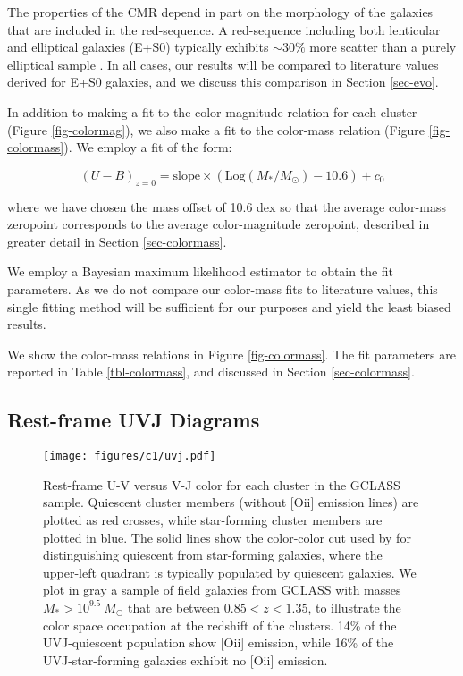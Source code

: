 The properties of the CMR depend in part on the morphology of the galaxies that are included in the red-sequence. A red-sequence including both lenticular and elliptical galaxies (E+S0) typically exhibits $\sim 30\%$ more scatter than a purely elliptical sample  \citep[see e.g.][M09]{Bower:1992mb}. In all cases, our results will be compared to literature values derived for E+S0 galaxies, and we discuss this comparison in Section \ref{sec-evo}.

In addition to making a fit to the color-magnitude relation for each cluster (Figure \ref{fig-colormag}), we also make a fit to the color-mass relation (Figure \ref{fig-colormass}). We employ a fit of the form:

\begin{equation}\label{eq-colormass}
(U-B)_{z=0} = \mathrm{slope} \times (\mathrm{Log}(M_*/M_{\odot})-10.6) + c_0
\end{equation}

where we have chosen the mass offset of 10.6 dex so that the average color-mass zeropoint corresponds to the average color-magnitude zeropoint, described in greater detail in Section \ref{sec-colormass}.

We employ a Bayesian maximum likelihood estimator to obtain the fit parameters. As we do not compare our color-mass fits to literature values, this single fitting method will be sufficient for our purposes and yield the least biased results.

We show the color-mass relations in Figure \ref{fig-colormass}. The fit parameters are reported in Table \ref{tbl-colormass}, and discussed in Section \ref{sec-colormass}.

\subsection{Rest-frame UVJ Diagrams}\label{sec-uvj}
\begin{figure*}
\centering \texttt{[image: figures/c1/uvj.pdf]}
\caption[\textit{U-V} versus \textit{V-J} color-color plot for each cluster in the GCLASS sample]{Rest-frame U-V versus V-J color for each cluster in the GCLASS sample. Quiescent cluster members (without [O{\sc ii}] emission lines) are plotted as red crosses, while star-forming cluster members are plotted in blue. The solid lines show the color-color cut used by \citet{Williams:2009tt} for distinguishing quiescent from star-forming galaxies, where the upper-left quadrant is typically populated by quiescent galaxies.
We plot in gray a sample of field galaxies from GCLASS with masses $M_* > 10^{9.5}~M_\odot$ that are between $0.85 < z < 1.35$, to illustrate the color space occupation at the redshift of the clusters.
14\% of the UVJ-quiescent population show [O{\sc ii}] emission, while 16\% of the UVJ-star-forming galaxies exhibit no [O{\sc ii}] emission.
\label{fig-uvj}}
\end{figure*}


